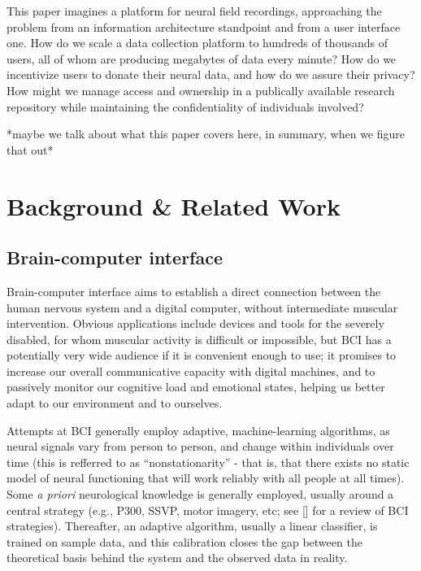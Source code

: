 \documentclass[a4paper,twoside]{article}
\begin{document}
This paper imagines a platform for neural field recordings, approaching the problem from an information architecture standpoint and from a user interface one. How do we scale a data collection platform to hundreds of thousands of users, all of whom are producing megabytes of data every minute? How do we incentivize users to donate their neural data, and how do we assure their privacy? How might we manage access and ownership in a publically available research repository while maintaining the confidentiality of individuals involved?

*maybe we talk about what this paper covers here, in summary, when we figure that out*






\section{Background \& Related Work}

\subsection{Brain-computer interface}

Brain-computer interface aims to establish a direct connection between the human nervous system and a digital computer, without intermediate muscular intervention. Obvious applications include devices and tools for the severely disabled, for whom muscular activity is difficult or impossible, but BCI has a potentially very wide audience if it is convenient enough to use; it promises to increase our overall communicative capacity with digital machines, and to passively monitor our cognitive load and emotional states, helping us better adapt to our environment and to ourselves.

Attempts at BCI generally employ adaptive, machine-learning algorithms, as neural signals vary from person to person, and change within individuals over time (this is refferred to as ``nonstationarity'' - that is,  that there exists no static model of neural functioning that will work reliably with all people at all times). Some \textit{a priori} neurological knowledge is generally employed, usually around a central strategy (e.g., P300, SSVP, motor imagery, etc; see [] for a review of BCI strategies). Thereafter, an adaptive algorithm, usually a linear classifier, is trained on sample data, and this calibration closes the gap between the theoretical basis behind the system and the observed data in reality.
\end{document}

